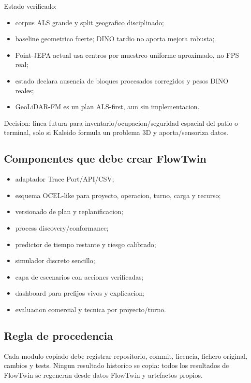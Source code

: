 \documentclass[
  spanish,
  10pt,
  a4paper,
]{article}
\providecommand{\tightlist}{%
  \setlength{\itemsep}{0pt}\setlength{\parskip}{0pt}}
\begin{document}
Estado verificado:

\begin{itemize}
\tightlist
\item
  corpus ALS grande y split geografico disciplinado;
\item
  baseline geometrico fuerte; DINO tardio no aporta mejora robusta;
\item
  Point-JEPA actual usa centros por muestreo uniforme aproximado, no FPS
  real;
\item
  estado declara ausencia de bloques procesados corregidos y pesos DINO
  reales;
\item
  GeoLiDAR-FM es un plan ALS-first, aun sin implementacion.
\end{itemize}

Decision: linea futura para inventario/ocupacion/seguridad espacial del
patio o terminal, solo si Kaleido formula un problema 3D y
aporta/sensoriza datos.

\subsection{Componentes que debe crear
FlowTwin}\label{componentes-que-debe-crear-flowtwin}

\begin{itemize}
\tightlist
\item
  adaptador Trace Port/API/CSV;
\item
  esquema OCEL-like para proyecto, operacion, turno, carga y recurso;
\item
  versionado de plan y replanificacion;
\item
  process discovery/conformance;
\item
  predictor de tiempo restante y riesgo calibrado;
\item
  simulador discreto sencillo;
\item
  capa de escenarios con acciones verificadas;
\item
  dashboard para prefijos vivos y explicacion;
\item
  evaluacion comercial y tecnica por proyecto/turno.
\end{itemize}

\subsection{Regla de procedencia}\label{regla-de-procedencia}

Cada modulo copiado debe registrar repositorio, commit, licencia,
fichero original, cambios y tests. Ningun resultado historico se copia:
todos los resultados de FlowTwin se regeneran desde datos FlowTwin y
artefactos propios.
\end{document}

